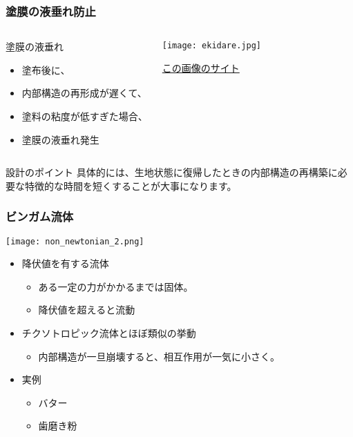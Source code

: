 \documentclass[12pt, dvipdfmx]{beamer}
\begin{document}
\begin{frame}
	\frametitle{塗膜の液垂れ防止}
			\begin{columns}[T, onlytextwidth]
					\begin{block}{塗膜の液垂れ}
						\begin{itemize}
							\item 塗布後に、
								\item 内部構造の再形成が遅くて、
								\item 塗料の粘度が低すぎた場合、
							\item 塗膜の液垂れ発生
						\end{itemize}
					\end{block}
					\begin{center}
						\texttt{[image: ekidare.jpg]}
		
						\href{http://www.owell.co.jp/knowlegde/trouble/ta004.html}{この画像のサイト}
					\end{center}
			\end{columns}
			\begin{alertblock}{設計のポイント}
				具体的には、生地状態に復帰したときの内部構造の再構築に必要な特徴的な時間を短くすることが大事になります。
			\end{alertblock}
\end{frame}

\begin{frame}
	\frametitle{ビンガム流体}
		\begin{center}
			\texttt{[image: non\_newtonian\_2.png]}
		\end{center}
		\begin{itemize}
			\item 降伏値を有する流体
			\begin{itemize}
				\item ある一定の力がかかるまでは固体。
				\item 降伏値を超えると流動
			\end{itemize}
			\item チクソトロピック流体とほぼ類似の挙動
			\begin{itemize}
				\item 内部構造が一旦崩壊すると、相互作用が一気に小さく。
			\end{itemize}
			\item 実例
			\begin{itemize}
				\item バター
				\item 歯磨き粉
			\end{itemize}
		\end{itemize}
\end{frame}
\end{document}
